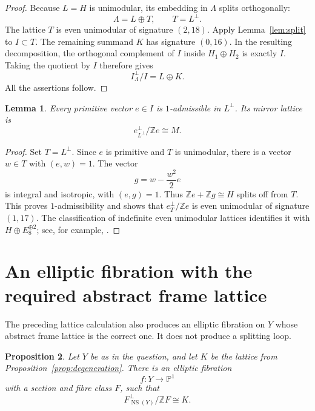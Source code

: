\documentclass[11pt]{article}
\newcommand{\Z}{\mathbb Z}
\newcommand{\NS}{\operatorname{NS}}
\newtheorem{lemma}{Lemma}[section]
\newtheorem{proposition}[lemma]{Proposition}
\theoremstyle{remark}
\begin{document}
\begin{proof}
Because \(L=H\) is unimodular, its embedding in \(\Lambda\) splits
orthogonally:
\[
 \Lambda=L\oplus T,
 \qquad T=L^\perp.
\]
The lattice \(T\) is even unimodular of signature \((2,18)\).
Apply Lemma~\ref{lem:split} to \(I\subset T\).
The remaining summand \(K\) has signature \((0,16)\).
In the resulting decomposition, the orthogonal complement of \(I\)
inside \(H_1\oplus H_2\) is exactly \(I\).  Taking the quotient by
\(I\) therefore gives
\[
 I^\perp_\Lambda/I=L\oplus K.
\]
All the assertions follow.
\end{proof}

\begin{lemma}\label{lem:mirror}
Every primitive vector \(e\in I\) is \(1\)-admissible in \(L^\perp\).
Its mirror lattice is
\[
 e^\perp_{L^\perp}/\Z e\cong M.
\]
\end{lemma}

\begin{proof}
Set \(T=L^\perp\).
Since \(e\) is primitive and \(T\) is unimodular, there is a vector
\(w\in T\) with \((e,w)=1\).
The vector
\[
 g=w-\frac{w^2}{2}e
\]
is integral and isotropic, with \((e,g)=1\).
Thus \(\Z e+\Z g\cong H\) splits off from \(T\).
This proves \(1\)-admissibility and shows that
\(e^\perp_T/\Z e\) is even unimodular of signature \((1,17)\).
The classification of indefinite even unimodular lattices identifies
it with \(H\oplus E_8^{\oplus2}\); see, for example,
\cite[Section~1.14]{Nik80}.
\end{proof}

\section{An elliptic fibration with the required abstract frame lattice}

The preceding lattice calculation also produces an elliptic fibration
on \(Y\) whose abstract frame lattice is the correct one.
It does not produce a splitting loop.

\begin{proposition}\label{prop:fibration}
Let \(Y\) be as in the question, and let \(K\) be the lattice from
Proposition~\ref{prop:degeneration}.
There is an elliptic fibration
\[
 f:Y\longrightarrow\mathbb P^1
\]
with a section and fibre class \(F\), such that
\[
 F^\perp_{\NS(Y)}/\Z F\cong K.
\]
\end{proposition}
\end{document}
